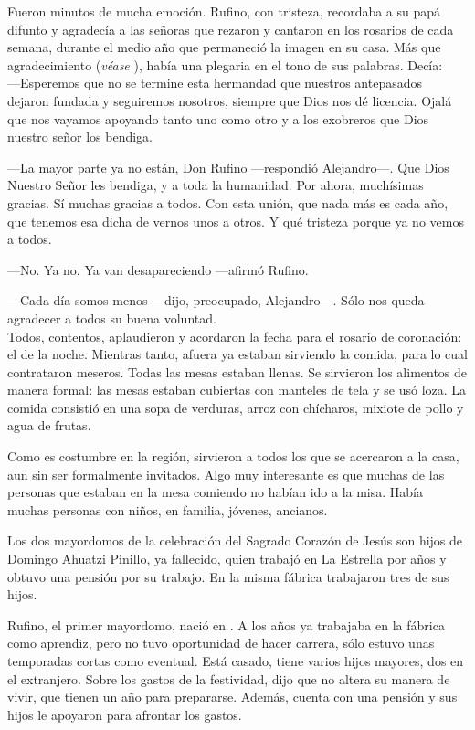 \documentclass[14pt,letterpaper,twoside]{extbook} %
\begin{document}
Fueron minutos de mucha emoción. Rufino, con tristeza, recordaba a su papá difunto y agradecía a las señoras que rezaron y cantaron en los rosarios de cada semana, durante el medio año que permaneció la imagen en su casa. Más que agradecimiento (\emph{véase} ), había una plegaria en el tono de sus palabras. Decía:\\

---Esperemos que no se termine esta hermandad que nuestros antepasados dejaron fundada y seguiremos nosotros, siempre que Dios nos dé licencia. Ojalá que nos vayamos apoyando tanto uno como otro y a los exobreros que Dios nuestro señor los bendiga.

---La mayor parte ya no están, Don Rufino ---respondió Alejandro---. Que Dios Nuestro Señor les bendiga, y a toda la humanidad. Por ahora, muchísimas gracias. Sí muchas gracias a todos. Con esta unión, que nada más es cada año, que tenemos esa dicha de vernos unos a otros. Y qué tristeza porque ya no vemos a todos.

\noindent ---No. Ya no. Ya van desapareciendo ---afirmó Rufino.

\noindent ---Cada día somos menos ---dijo, preocupado, Alejandro---. Sólo nos queda agradecer a todos su buena voluntad. \\

\noindent Todos, contentos, aplaudieron y acordaron la fecha para el rosario de coronación: el  de la noche. Mientras tanto, afuera ya estaban sirviendo la comida, para lo cual contrataron meseros. Todas las mesas estaban llenas. Se sirvieron los alimentos de manera formal: las mesas estaban cubiertas con manteles de tela y se usó loza. La comida consistió en una sopa de verduras, arroz con chícharos, mixiote de pollo y agua de frutas.

Como es costumbre en la región, sirvieron a todos los que se acercaron a la casa, aun sin ser formalmente invitados. Algo muy interesante es que muchas de las personas que estaban en la mesa comiendo no habían ido a la misa. Había muchas personas con niños, en familia, jóvenes, ancianos.

Los dos mayordomos de la celebración del Sagrado Corazón de Jesús son hijos de Domingo Ahuatzi Pinillo, ya fallecido, quien trabajó en La Estrella por  años y obtuvo una pensión por su trabajo. En la misma fábrica trabajaron tres de sus hijos.

Rufino, el primer mayordomo, nació en . A los  años ya trabajaba en la fábrica como aprendiz, pero no tuvo oportunidad de hacer carrera, sólo estuvo unas temporadas cortas como eventual. Está casado, tiene varios hijos mayores, dos en el extranjero. Sobre los gastos de la festividad, dijo que no altera su manera de vivir, que tienen un año para prepararse. Además, cuenta con una pensión y sus hijos le apoyaron para afrontar los gastos.
\end{document}
